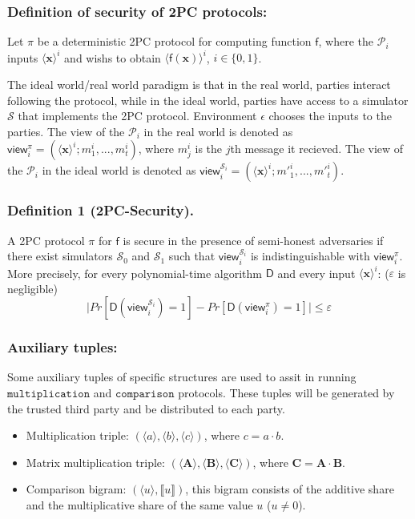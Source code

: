 \documentclass[letterpaper]{article} %
\begin{document}
    \subsubsection{Definition of security of 2PC protocols:}
    Let $\pi $ be a deterministic 2PC protocol for computing
    function $\mathsf{f}$,
    where the $\mathcal{P}_{i}$ inputs $\langle \mathbf{x}\rangle ^{i}$
    and wishs to obtain $\langle \mathsf{f}(\mathbf{x}) \rangle ^{i}$, $i \in \{0,1\}$.

    The ideal world/real world paradigm \cite{SecurityProof} is that
    in the real world, parties interact following the protocol,
    while in the ideal world, parties have access to a
    simulator $\mathcal{S}$ that implements the 2PC protocol.
    Environment $\epsilon $ chooses the
    inputs to the parties.
    The view of the $\mathcal{P}_{i}$ in the real world
    is denoted as $\mathsf{view}_{i}^{\pi}=(\langle \mathbf{x}\rangle ^{i};m^{i}_{1},...,m^{i}_{t})$,
    where $m^{i}_{j}$ is the $j$th message it recieved. The view of the $\mathcal{P}_{i}$ in the ideal world
    is denoted as $\mathsf{view}_{i}^{\mathcal{S}_{i}}=(\langle \mathbf{x}\rangle ^{i};m'^{i}_{1},...,m'^{i}_{t})$.

    \subsubsection{Definition 1 (2PC-Security).}
    A 2PC protocol $\pi$ for $\mathsf{f}$ is secure in the presence of semi-honest adversaries
    if there exist simulators $\mathcal{S}_{0}$ and $\mathcal{S}_{1}$ such that
    $\mathsf{view}_{i}^{\mathcal{S}_{i}}$ is indistinguishable with $\mathsf{view}_{i}^{\pi}$.
    More precisely,
    for every polynomial-time algorithm $\mathsf{D}$ and every input $\langle \mathbf{x}\rangle ^{i}$: ($\varepsilon $ is negligible)
        $$\lvert Pr[\mathsf{D}(\mathsf{view}_{i}^{\mathcal{S}_{i}})=1]-Pr[\mathsf{D}(\mathsf{view}_{i}^{\pi})=1]\rvert \leq \varepsilon   $$


    \subsubsection{Auxiliary tuples:}
    Some auxiliary tuples of specific structures are used to
    assit in running $\mathtt{multiplication}$ and $\mathtt{comparison}$ protocols.
    These tuples will be generated by the trusted third party and be distributed to each party.
    \begin{itemize}
        \item Multiplication triple: $(\langle a\rangle,\langle b\rangle,\langle c\rangle)$, where $c=a\cdot b$.
        \item Matrix multiplication triple: $(\langle \mathbf{A}\rangle,\langle \mathbf{B}\rangle,\langle \mathbf{C}\rangle)$, where $\mathbf{C}=\mathbf{A}\cdot \mathbf{B}$.
        \item Comparison bigram: $(\langle u\rangle,\llbracket u \rrbracket)$,
        this bigram consists of the additive share and the multiplicative share of the same value $u$ ($u\neq 0 $).
    \end{itemize}
\end{document}
